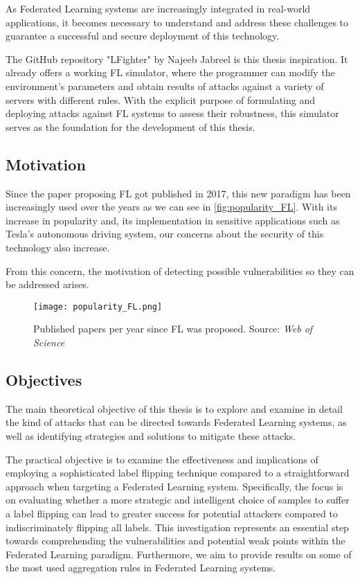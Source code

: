 As Federated Learning systems are increasingly integrated in real-world applications, it becomes necessary to understand and address these challenges to guarantee a successful and secure deployment of this technology.


The GitHub repository "LFighter" \cite{LFighter_code} by Najeeb Jabreel is this thesis inspiration. It already offers a working FL simulator, where the programmer can modify the environment's parameters and obtain results of attacks against a variety of servers with different rules. With the explicit purpose of formulating and deploying attacks against FL systems to assess their robustness, this simulator serves as the foundation for the development of this thesis.



\subsection{Motivation}
Since the paper proposing FL got published in 2017, this new paradigm has been increasingly used over the years as we can see in \autoref{fig:popularity_FL}.
With its increase in popularity and, its implementation in sensitive applications such as Tesla's autonomous driving system, our concerns about the security of this technology also increase.

From this concern, the motivation of detecting possible vulnerabilities so they can be addressed arises. 

\begin{figure}[h!]
        \centering %
        \texttt{[image: popularity\_FL.png]}
        \caption{Published papers per year since FL was proposed. Source: \textit{Web of Science}} %
        \label{fig:popularity_FL}
    \end{figure}

\subsection{Objectives}
The main theoretical objective of this thesis is to explore and examine in detail the kind of attacks that can be directed towards Federated Learning systems, as well as identifying strategies and solutions to mitigate these attacks. 

The practical objective is to examine the effectiveness and implications of employing a sophisticated label flipping technique compared to a straightforward approach when targeting a Federated Learning system. Specifically, the focus is on evaluating whether a more strategic and intelligent choice of samples to suffer a label flipping can lead to greater success for potential attackers compared to indiscriminately flipping all labels. This investigation represents an essential step towards comprehending the vulnerabilities and potential weak points within the Federated Learning paradigm. Furthermore, we aim to provide results on some of the most used aggregation rules in Federated Learning systems.

